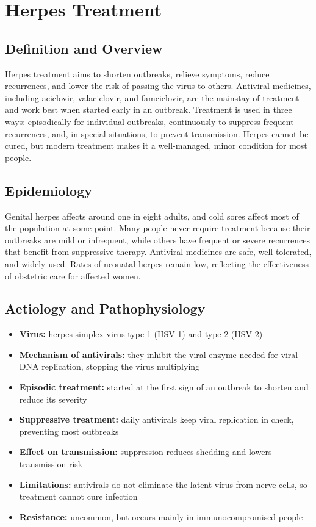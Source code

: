 \chapter{Herpes Treatment}

\section*{Definition and Overview}
Herpes treatment aims to shorten outbreaks, relieve symptoms, reduce recurrences, and lower the risk of passing the virus to others. Antiviral medicines, including aciclovir, valaciclovir, and famciclovir, are the mainstay of treatment and work best when started early in an outbreak. Treatment is used in three ways: episodically for individual outbreaks, continuously to suppress frequent recurrences, and, in special situations, to prevent transmission. Herpes cannot be cured, but modern treatment makes it a well-managed, minor condition for most people.

\section*{Epidemiology}
Genital herpes affects around one in eight adults, and cold sores affect most of the population at some point. Many people never require treatment because their outbreaks are mild or infrequent, while others have frequent or severe recurrences that benefit from suppressive therapy. Antiviral medicines are safe, well tolerated, and widely used. Rates of neonatal herpes remain low, reflecting the effectiveness of obstetric care for affected women.

\section*{Aetiology and Pathophysiology}
\begin{itemize}
    \item \textbf{Virus:} herpes simplex virus type 1 (HSV-1) and type 2 (HSV-2)
    \item \textbf{Mechanism of antivirals:} they inhibit the viral enzyme needed for viral DNA replication, stopping the virus multiplying
    \item \textbf{Episodic treatment:} started at the first sign of an outbreak to shorten and reduce its severity
    \item \textbf{Suppressive treatment:} daily antivirals keep viral replication in check, preventing most outbreaks
    \item \textbf{Effect on transmission:} suppression reduces shedding and lowers transmission risk
    \item \textbf{Limitations:} antivirals do not eliminate the latent virus from nerve cells, so treatment cannot cure infection
    \item \textbf{Resistance:} uncommon, but occurs mainly in immunocompromised people
\end{itemize}

